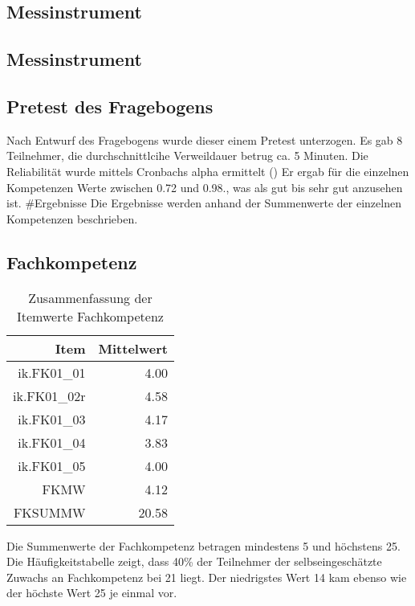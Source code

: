 \documentclass[12pt, bibliography=totoc]{scrartcl}
\begin{document}
\subsection{Messinstrument}\label{messinstrument}

\subsection{Messinstrument}\label{messinstrument-1}

\subsection{Pretest des Fragebogens}\label{pretest-des-fragebogens}

Nach Entwurf des Fragebogens wurde dieser einem Pretest unterzogen. Es
gab 8 Teilnehmer, die durchschnittlcihe Verweildauer betrug ca. 5
Minuten. Die Reliabilität wurde mittels Cronbachs alpha ermittelt
(\textcite{Wassa}) Er ergab für die einzelnen Kompetenzen Werte zwischen
0.72 und 0.98., was als gut bis sehr gut anzusehen ist. \#Ergebnisse Die
Ergebnisse werden anhand der Summenwerte der einzelnen Kompetenzen
beschrieben.

\subsection{Fachkompetenz}\label{fachkompetenz}

\begin{table}[ht]
\centering
\caption{Zusammenfassung der Itemwerte Fachkompetenz}
\begin{tabular}{rr}
  \hline
 Item & Mittelwert \\
  \hline
ik.FK01\_01 & 4.00 \\
  ik.FK01\_02r & 4.58 \\
  ik.FK01\_03 & 4.17 \\
  ik.FK01\_04 & 3.83 \\
  ik.FK01\_05 & 4.00 \\
  FKMW & 4.12 \\
  FKSUMMW & 20.58 \\
   \hline
\end{tabular}
\end{table}

Die Summenwerte der Fachkompetenz betragen mindestens 5 und höchstens
25. Die Häufigkeitstabelle zeigt, dass 40\% der Teilnehmer der
selbseingeschätzte Zuwachs an Fachkompetenz bei 21 liegt. Der
niedrigstes Wert 14 kam ebenso wie der höchste Wert 25 je einmal vor.
\end{document}
